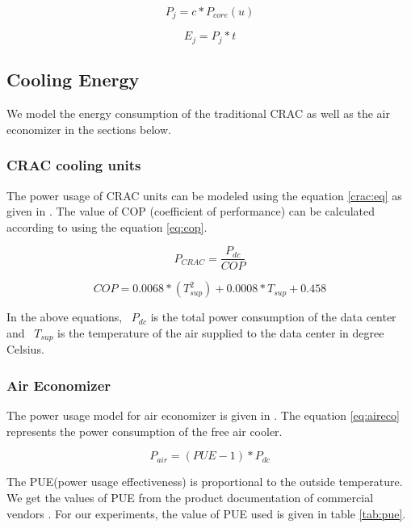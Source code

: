 \documentclass[conference,12pt]{IEEEtran}
\begin{document}
\begin{equation} \label{eq:power_job}
P_{j} = c*P_{core}(u)
\end{equation}

\begin{equation} \label{eq:energy_job}
E_{j} = P_{j}*t
\end{equation}


\subsection{Cooling Energy}
\label{sec:coole}
We model the energy consumption of the traditional CRAC as well as the air economizer in the sections below. 

\subsubsection{CRAC cooling units}
The power usage of CRAC units can be modeled using the equation  \ref{crac:eq} as given in \cite{christy2011energy}. The value of COP (coefficient of performance) can be calculated according to \cite{ahmad2010joint} using the equation \ref{eq:cop}. 

\begin{equation} \label{crac:eq}
P_{CRAC} = \frac{P_{dc}}{COP}
\end{equation}

\begin{equation} \label{eq:cop}
COP = 0.0068*(T_{sup}^2) + 0.0008*T_{sup} + 0.458
\end{equation}

In the above equations, ~$P_{dc}$ is the total power consumption of the data center and ~$T_{sup}$ is the temperature of the air supplied to the data center in degree Celsius.

\subsubsection{Air Economizer}

The power usage model for air economizer is given in \cite{christy2011energy}. The equation \ref{eq:aireco} represents the power consumption of the free air cooler. 


\begin{equation} \label{eq:aireco}
P_{air} = (PUE - 1) * P_{dc}
\end{equation}

The PUE(power usage effectiveness) is proportional to the outside temperature. We get the values of PUE from the product documentation of commercial vendors \cite{airecoproduct}. For our experiments, the value of PUE used is given in table \ref{tab:pue}.
\end{document}
